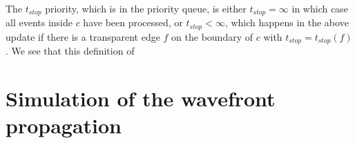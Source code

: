 The $t_{stop}$ priority, which is in the priority queue, is either $t_{stop} = \infty$ in which case all events inside $c$ have been 
processed, or $t_{stop} < \infty$, which happens in the above update if there is a transparent edge $f$ on the boundary of $c$ with 
$t_{stop} = t_{stop}(f)$. We see that this definition of 

\section{Simulation of the wavefront propagation}



